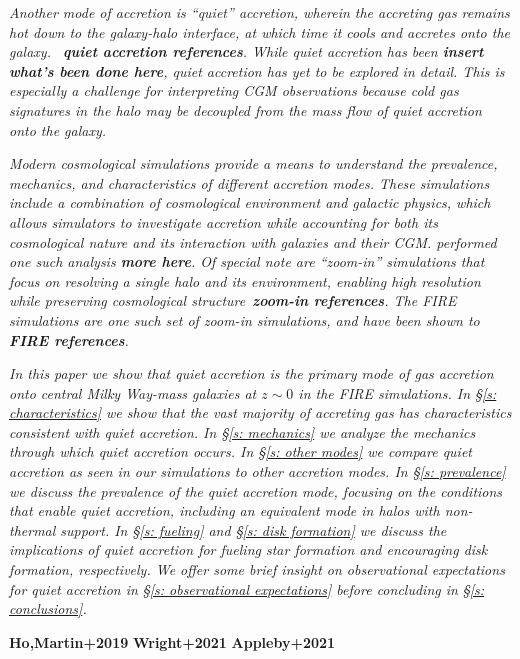 \documentclass[fleqn,usenatbib]{mnras}
\begin{document}
\textit{
Another mode of accretion is ``quiet'' accretion, wherein the accreting gas remains hot down to the galaxy-halo interface, at which time it cools and accretes onto the galaxy.
~\textbf{quiet accretion references}. 
While quiet accretion has been \textbf{insert what's been done here}, quiet accretion has yet to be explored in detail.
This is especially a challenge for interpreting CGM observations because cold gas signatures in the halo may be decoupled from the mass flow of quiet accretion onto the galaxy.
}

\textit{
Modern cosmological simulations provide a means to understand the prevalence, mechanics, and characteristics of different accretion modes.
These simulations include a combination of cosmological environment and galactic physics, which allows simulators to investigate accretion while accounting for both its cosmological nature and its interaction with galaxies and their CGM.
\cite{Ho2019} performed one such analysis \textbf{more here}.
Of special note are ``zoom-in'' simulations that focus on resolving a single halo and its environment, enabling high resolution while preserving cosmological structure~\textbf{zoom-in references}.
The FIRE simulations are one such set of zoom-in simulations, and have been shown to \textbf{FIRE references}.
}

\textit{
In this paper we show that quiet accretion is the primary mode of gas accretion onto central Milky Way-mass galaxies at $z \sim 0$ in the FIRE simulations.
In \S\ref{s: characteristics} we show that the vast majority of accreting gas has characteristics consistent with quiet accretion.
In \S\ref{s: mechanics} we analyze the mechanics through which quiet accretion occurs.
In \S\ref{s: other modes} we compare quiet accretion as seen in our simulations to other accretion modes.
In \S\ref{s: prevalence} we discuss the prevalence of the quiet accretion mode, focusing on the conditions that enable quiet accretion, including an equivalent mode in halos with non-thermal support.
In \S\ref{s: fueling} and \S\ref{s: disk formation} we discuss the implications of quiet accretion for fueling star formation and encouraging disk formation, respectively.
We offer some brief insight on observational expectations for quiet accretion in \S\ref{s: observational expectations} before concluding in \S\ref{s: conclusions}.
}

\textbf{Ho,Martin+2019}
\textbf{Wright+2021}
\textbf{Appleby+2021}
\end{document}
